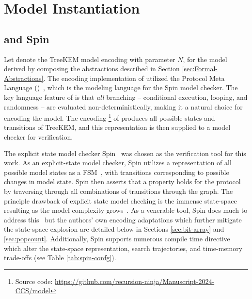 \documentclass[authordraft,sigconf]{acmart}
\newcommand{\Abrev}[1]{\gls{#1}}
\begin{document}
\section{Model Instantiation}

\subsection{\Promela and Spin}

\newcommand\dblwrr{\wr\mkern-2mu\wr}

Let  denote the TreeKEM model encoding with parameter $N$, for the model derived by composing the abstractions described in Section \ref{sec:Formal-Abstractions}.
The encoding implementation of  utilized the Protocol Meta Language (\Promela)~\cite{HolzmannSpinBook2003}, 
which is the modeling language for the Spin model checker. 
The key language feature of \Promela is that \emph{all} branching -- conditional execution, looping, and randomness -- are evaluated non-deterministically, making it a natural choice for encoding the model.
The \Promela encoding \footnote{Source code: \url{https://github.com/recursion-ninja/Manuscript-2024-CCS/model}} of  produces all possible states and transitions of TreeKEM, and this representation is then supplied to a model checker for verification.


The explicit state model checker Spin~\cite{HolzmannSpinBook2003} was chosen as the verification tool for this work.
As an explicit-state model checker, Spin utilizes a representation of all possible model states as a \Abrev{FSM}~\cite{clarke1981design}, with transitions corresponding to possible changes in model state.
Spin then asserts that a property holds for the protocol by traversing through all combinations of transitions through the graph.
The principle drawback of explicit state model checking is the immense state-space resulting as the model complexity grows~\cite{burch1992symbolic}.
As a venerable tool, Spin does much to address this~\cite{rudin1987limits} but the authors' own encoding adaptations which further mitigate the state-space explosion are detailed below in Sections \ref{sec:bit-array} and \ref{sec:popcount}.
Additionally, Spin supports numerous compile time directive which alter the state-space representation, search trajectories, and time-memory trade-offs (see Table \ref{tab:spin-confg}).
\end{document}
